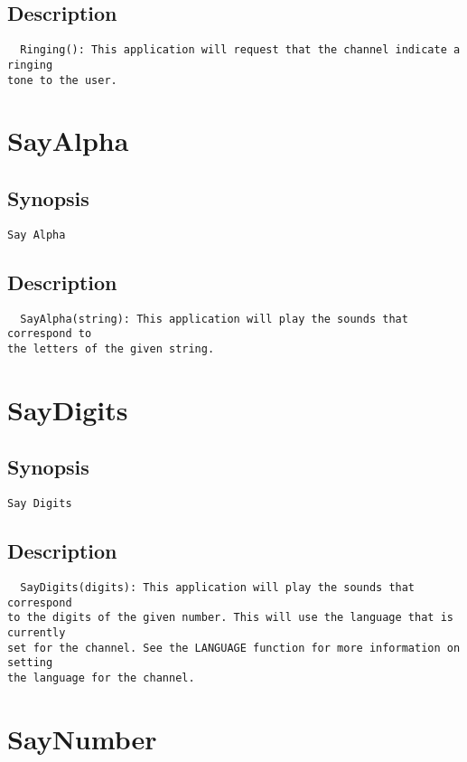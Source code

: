\subsection{Description}
\begin{verbatim}
  Ringing(): This application will request that the channel indicate a ringing
tone to the user.

\end{verbatim}


\section{SayAlpha}
\subsection{Synopsis}
\begin{verbatim}
Say Alpha
\end{verbatim}
\subsection{Description}
\begin{verbatim}
  SayAlpha(string): This application will play the sounds that correspond to
the letters of the given string.

\end{verbatim}


\section{SayDigits}
\subsection{Synopsis}
\begin{verbatim}
Say Digits
\end{verbatim}
\subsection{Description}
\begin{verbatim}
  SayDigits(digits): This application will play the sounds that correspond
to the digits of the given number. This will use the language that is currently
set for the channel. See the LANGUAGE function for more information on setting
the language for the channel.

\end{verbatim}


\section{SayNumber}
